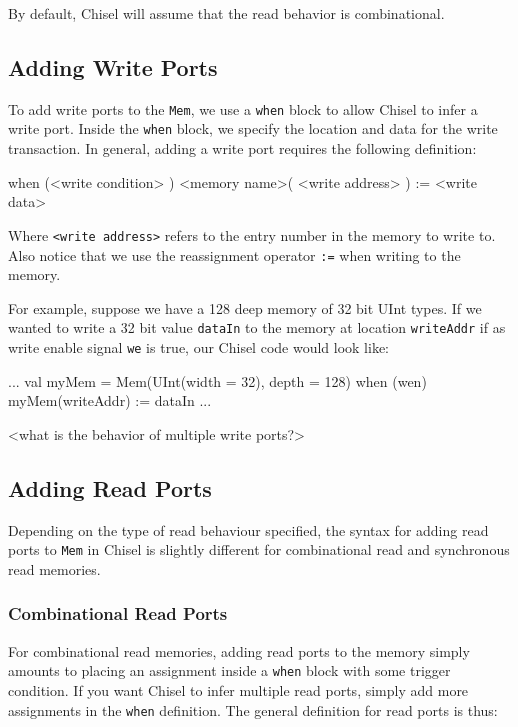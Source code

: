 
By default, Chisel will assume that the read behavior is combinational.

\subsection{Adding Write Ports}

To add write ports to the \verb+Mem+, we use a \verb+when+ block to allow Chisel to infer a write port. Inside the \verb+when+ block, we specify the location and data for the write transaction. In general, adding a write port requires the following definition:

\begin{scala}
when (<write condition> ) {
  <memory name>( <write address> ) := <write data>
}
\end{scala}

Where \verb+<write address>+ refers to the entry number in the memory to write to. Also notice that we use the reassignment operator \verb+:=+ when writing to the memory. 


For example, suppose we have a 128 deep memory of 32 bit UInt types. If we wanted to write a 32 bit value \verb+dataIn+ to the memory at location \verb+writeAddr+ if as write enable signal \verb+we+ is true, our Chisel code would look like:

\begin{scala}
...
val myMem = Mem(UInt(width = 32), depth = 128)
when (wen) {
  myMem(writeAddr) := dataIn
}
...
\end{scala}

<what is the behavior of multiple write ports?>

\subsection{Adding Read Ports}

Depending on the type of read behaviour specified, the syntax for adding read ports to \verb+Mem+ in Chisel is slightly different for combinational read and synchronous read memories.

\subsubsection{Combinational Read Ports}

For combinational read memories, adding read ports to the memory simply amounts to placing an assignment inside a \verb+when+ block with some trigger condition. If you want Chisel to infer multiple read ports, simply add more assignments in the \verb+when+ definition. The general definition for read ports is thus:

